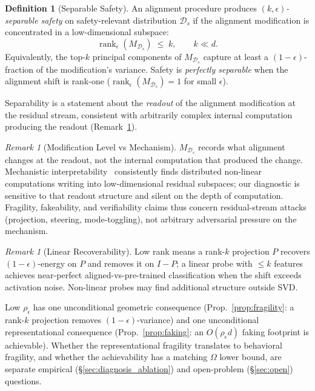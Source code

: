 \documentclass[10pt]{article}
\theoremstyle{definition}
\newtheorem{definition}[theorem]{Definition}
\theoremstyle{remark}
\newtheorem{remark}[theorem]{Remark}
\begin{document}
\begin{definition}[Separable Safety]
\label{def:separable}
An alignment procedure produces
\emph{$(k, \epsilon)$-separable safety} on safety-relevant
distribution $\mathcal{D}_s$ if the alignment modification
is concentrated in a low-dimensional subspace:
\begin{equation}
  \operatorname{rank}_{\epsilon}(M_{\mathcal{D}_s})
  \;\leq\; k,
  \qquad k \ll d.
  \label{eq:separable}
\end{equation}
Equivalently, the top-$k$ principal components of
$M_{\mathcal{D}_s}$ capture at least a
$(1-\epsilon)$-fraction of the modification's variance.
Safety is \emph{perfectly separable} when the alignment
shift is rank-one
($\operatorname{rank}_{\epsilon}(M_{\mathcal{D}_s}) = 1$
for small $\epsilon$).
\end{definition}

Separability is a statement about the \emph{readout}
of the alignment modification at the residual stream,
consistent with arbitrarily complex internal computation
producing the readout (Remark~\ref{rem:readout_vs_mechanism}).

\begin{remark}[Modification Level vs Mechanism]
\label{rem:readout_vs_mechanism}
$M_{\mathcal{D}_s}$ records what alignment changes at
the readout, not the internal computation that produced
the change.  Mechanistic interpretability~\citep{olah2020zoom,
arditi2024refusal, wollschlager2025} consistently finds
distributed non-linear computations writing into
low-dimensional residual subspaces; our diagnostic is
sensitive to that readout structure and silent on the
depth of computation.  Fragility, fakeability, and
verifiability claims thus concern residual-stream attacks
(projection, steering, mode-toggling), not arbitrary
adversarial pressure on the mechanism.
\end{remark}

\begin{remark}[Linear Recoverability]
\label{rem:recoverability}
Low rank means a rank-$k$ projection $P$ recovers
$(1-\epsilon)$-energy on $P$ and removes it on $I-P$;
a linear probe with $\leq k$ features achieves
near-perfect aligned-vs-pre-trained classification when
the shift exceeds activation noise.  Non-linear probes
may find additional structure outside SVD.
\end{remark}

Low $\rho_{\epsilon}$ has one unconditional geometric
consequence (Prop.~\ref{prop:fragility}: a rank-$k$
projection removes $(1-\epsilon)$-variance) and one
unconditional representational consequence
(Prop.~\ref{prop:faking}: an $O(\rho_{\epsilon}d)$
faking footprint is achievable).  Whether the
representational fragility translates to behavioral
fragility, and whether the achievability has a matching
$\Omega$ lower bound, are separate empirical
(\S\ref{sec:diagnosis_ablation}) and open-problem
(\S\ref{sec:open}) questions.
\end{document}

